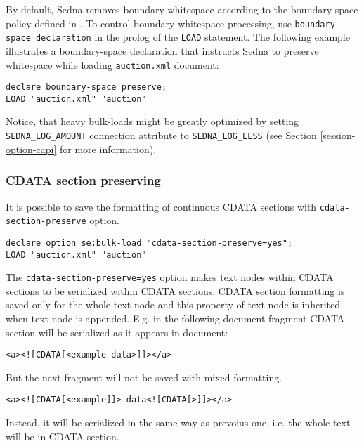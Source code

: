 \documentclass[a4paper,12pt]{article}
\begin{document}
By default, Sedna removes boundary whitespace according to the boundary-space
policy defined in \cite{paper:query-language}. To control boundary whitespace
processing, use \verb!boundary-space declaration! \cite{paper:query-language} in
the prolog of the \verb!LOAD! statement. The following example illustrates a
boundary-space declaration that instructs Sedna to preserve whitespace while
loading \verb!auction.xml! document:

\begin{verbatim}
declare boundary-space preserve;
LOAD "auction.xml" "auction"
\end{verbatim}

Notice, that heavy bulk-loads might be greatly optimized by setting
\verb!SEDNA_LOG_AMOUNT! connection attribute to \verb!SEDNA_LOG_LESS! (see
Section \ref{session-option-capi} for more information).

\subsubsection{CDATA section preserving}

It is possible to save the formatting of continuous CDATA sections with
\verb!cdata-section-preserve! option.

\begin{verbatim}
declare option se:bulk-load "cdata-section-preserve=yes";
LOAD "auction.xml" "auction"
\end{verbatim}

The \verb/cdata-section-preserve=yes/ option makes text nodes within CDATA
sections to be serialized within CDATA sections. CDATA section formatting is
saved only for the whole text node and this property of text node is inherited
when text node is appended. E.g. in the following document fragment CDATA
section will be serialized as it appears in document:

\begin{verbatim}
<a><![CDATA[<example data>]]></a>
\end{verbatim}

But the next fragment will not be saved with mixed formatting.

\begin{verbatim}
<a><![CDATA[<example]]> data<![CDATA[>]]></a>
\end{verbatim}

Instead, it will be serialized in the same way as prevoius one, i.e. the whole
text will be in CDATA section.

\end{document}
